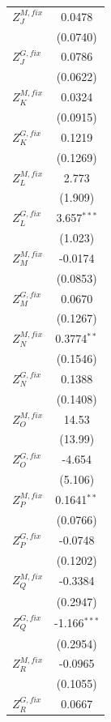 \begin{tabular}{lc}
   $Z^{M,fix}_J$   & 0.0478\\   
                   & (0.0740)\\   
   $Z^{G,fix}_J$   & 0.0786\\   
                   & (0.0622)\\   
   $Z^{M,fix}_K$   & 0.0324\\   
                   & (0.0915)\\   
   $Z^{G,fix}_K$   & 0.1219\\   
                   & (0.1269)\\   
   $Z^{M,fix}_L$   & 2.773\\   
                   & (1.909)\\   
   $Z^{G,fix}_L$   & 3.657$^{***}$\\   
                   & (1.023)\\   
   $Z^{M,fix}_M$   & -0.0174\\   
                   & (0.0853)\\   
   $Z^{G,fix}_M$   & 0.0670\\   
                   & (0.1267)\\   
   $Z^{M,fix}_N$   & 0.3774$^{**}$\\   
                   & (0.1546)\\   
   $Z^{G,fix}_N$   & 0.1388\\   
                   & (0.1408)\\   
   $Z^{M,fix}_O$   & 14.53\\   
                   & (13.99)\\   
   $Z^{G,fix}_O$   & -4.654\\   
                   & (5.106)\\   
   $Z^{M,fix}_P$   & 0.1641$^{**}$\\   
                   & (0.0766)\\   
   $Z^{G,fix}_P$   & -0.0748\\   
                   & (0.1202)\\   
   $Z^{M,fix}_Q$   & -0.3384\\   
                   & (0.2947)\\   
   $Z^{G,fix}_Q$   & -1.166$^{***}$\\   
                   & (0.2954)\\   
   $Z^{M,fix}_R$   & -0.0965\\   
                   & (0.1055)\\   
   $Z^{G,fix}_R$   & 0.0667\\   

\end{tabular}
